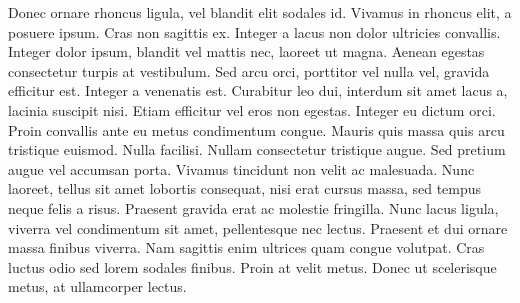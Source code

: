 \documentclass[a4paper]{memoir}
\begin{document}
Donec ornare rhoncus ligula, vel blandit elit sodales id. Vivamus in rhoncus elit, a posuere ipsum. Cras non sagittis ex. Integer a lacus non dolor ultricies convallis. Integer dolor ipsum, blandit vel mattis nec, laoreet ut magna. Aenean egestas consectetur turpis at vestibulum. Sed arcu orci, porttitor vel nulla vel, gravida efficitur est. Integer a venenatis est. Curabitur leo dui, interdum sit amet lacus a, lacinia suscipit nisi. Etiam efficitur vel eros non egestas. Integer eu dictum orci. Proin convallis ante eu metus condimentum congue. Mauris quis massa quis arcu tristique euismod. Nulla facilisi. Nullam consectetur tristique augue.
Sed pretium augue vel accumsan porta. Vivamus tincidunt non velit ac malesuada. Nunc laoreet, tellus sit amet lobortis consequat, nisi erat cursus massa, sed tempus neque felis a risus. Praesent gravida erat ac molestie fringilla. Nunc lacus ligula, viverra vel condimentum sit amet, pellentesque nec lectus. Praesent et dui ornare massa finibus viverra. Nam sagittis enim ultrices quam congue volutpat. Cras luctus odio sed lorem sodales finibus. Proin at velit metus. Donec ut scelerisque metus, at ullamcorper lectus. 
\end{document}
